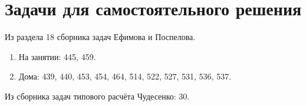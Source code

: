 \section*{Задачи для самостоятельного решения}

Из раздела 18 сборника задач Ефимова и Поспелова.
\begin{enumerate}
    \item На занятии: 445, 459.
    \item Дома: 439, 440, 453, 454, 464, 514, 522, 527, 531, 536, 537.
\end{enumerate}

Из сборника задач типового расчёта Чудесенко: 30.
